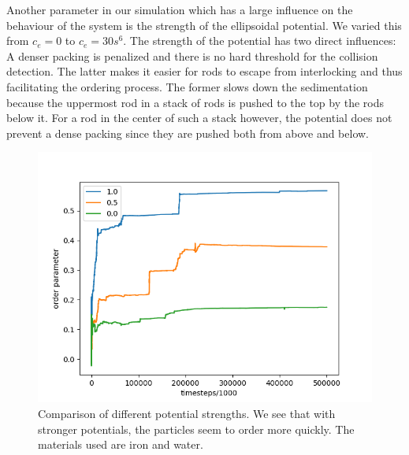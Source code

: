 Another parameter in our simulation which has a large influence on the behaviour of the system is the strength of the ellipsoidal potential. We varied this from $c_e =0$ to $c_e=30s^6$. The strength of the potential has two direct influences: A denser packing is penalized and  there is no hard threshold for the collision detection. The latter makes it easier for rods to escape from interlocking and thus facilitating the ordering process. The former slows down the sedimentation because the uppermost rod in  a stack of rods is pushed to the top by the rods below it. For a rod in the center of such a stack however, the potential does not prevent a dense packing since they are pushed both from above and below.   
\begin{figure}
  \begin{minipage}[t]{0.75\textwidth}
     \hspace{-0.1\textwidth}
     \includegraphics[width=1.2\textwidth]{data/pot_comb_order_parameter_three.png}
  \end{minipage}
  \hfill
  \begin{minipage}[b]{0.2\textwidth}
  {\setcapindent{0pt} \caption{Comparison of different potential strengths. We see that with stronger potentials, the particles seem to order more quickly. The materials used are iron and water.}}
  \vspace{25 pt}
\end{minipage}
\label{fig:pot_comp}
\end{figure}

